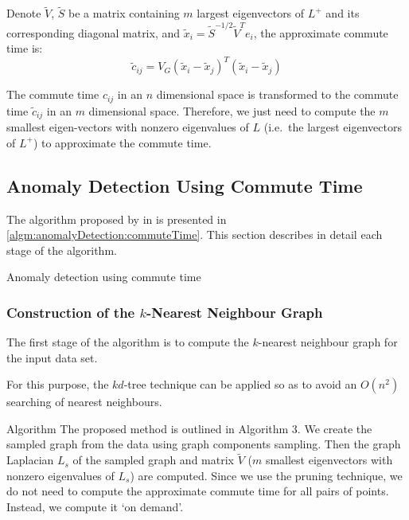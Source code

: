 Denote $\tilde{V}$, $\tilde{S}$ be a matrix containing $m$ largest eigenvectors of $L^+$ and its corresponding diagonal matrix, and $\tilde{x}_i = \tilde{S}^{-1/2}\tilde{V}^Te_i$, the approximate commute time is:
\begin{equation}
\tilde{c}_{ij} = V_G(\tilde{x}_i - \tilde{x}_j)^T(\tilde{x}_i - \tilde{x}_j)
\end{equation}

The commute time $c_{ij}$ in an $n$ dimensional space is transformed to the commute time $\tilde{c}_{ij}$ in an $m$ dimensional space. Therefore, we just need to compute the $m$ smallest eigen-vectors with nonzero eigenvalues of $L$ (i.e.\ the largest eigenvectors of $L^+$) to approximate the commute time.

\subsection{Anomaly Detection Using Commute Time}
\label{anomalyDetection:commuteTime:algorithm}
The algorithm proposed by \citeauthor{Khoa:2012} in 
\cite{Khoa:2012} is presented in \autoref{algm:anomalyDetection:commuteTime}.
This section describes in detail each stage of the algorithm.

\begin{algorithm}[t]
    
    \caption{Anomaly detection using commute time}
    \label{algm:anomalyDetection:commuteTime}
\end{algorithm}

\subsubsection{Construction of the $k$-Nearest Neighbour Graph}
\label{anomalyDetection:commuteTime:algorithm:knnGraph}
The first stage of the algorithm is to compute the $k$-nearest neighbour graph
for the input data set.

For this purpose, the $kd$-tree technique can be applied so as to avoid an
$O(n^2)$ searching of nearest neighbours.

Algorithm
The proposed method is outlined in Algorithm 3. We create the sampled graph from the data using graph components sampling. Then the graph Laplacian $L_s$ of the sampled graph and matrix $\tilde{V}$ ($m$ smallest eigenvectors with nonzero eigenvalues of $L_s$) are computed. Since we use the pruning technique, we do not need to compute the approximate commute time for all pairs of points. Instead, we compute it `on demand'.

